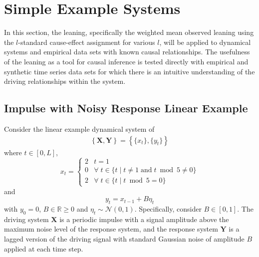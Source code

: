 \documentclass[twocolumn,aps,pre,groupedaddress]{revtex4-1}
\begin{document}
\section{Simple Example Systems}
In this section, the leaning, specifically the weighted mean observed leaning using the $l$-standard cause-effect assignment for various $l$, will be applied to dynamical systems and empirical data sets with known causal relationships.  The usefulness of the leaning as a tool for causal inference is tested directly with empirical and synthetic time series data sets for which there is an intuitive understanding of the driving relationships within the system.

\subsection{Impulse with Noisy Response Linear Example}
\label{sec:IR}
Consider the linear example dynamical system of
\begin{eqnarray}
\label{eqn:IReqn}
\left\{\mathbf{X},\mathbf{Y}\right\} = \left\{\{x_t\},\{y_t\}\right\}
\end{eqnarray}
where $t\in[0,L]$,
\begin{equation*}
x_t = \left\{
  \begin{array}{lr}
    2 & t = 1\\
    0 & \forall\; t\in\{t\;|\;t\neq 1 \;\mathrm{and}\; t\bmod 5 \neq 0\}\\
    2 & \forall\; t\in\{t\;|\;t\bmod 5 = 0\}
  \end{array}
\right.
\end{equation*}
and
\begin{equation*}
y_t = x_{t-1} + B\eta_t
\end{equation*}
with $y_0 = 0$, $B\in\mathbb{R}\ge 0$ and $\eta_t\sim\mathcal{N}\left(0,1\right)$.  Specifically, consider $B\in[0,1]$.  The driving system $\mathbf{X}$ is a periodic impulse with a signal amplitude above the maximum noise level of the response system, and the response system $\mathbf{Y}$ is a lagged version of the driving signal with standard Gaussian noise of amplitude $B$ applied at each time step.  
\end{document}
